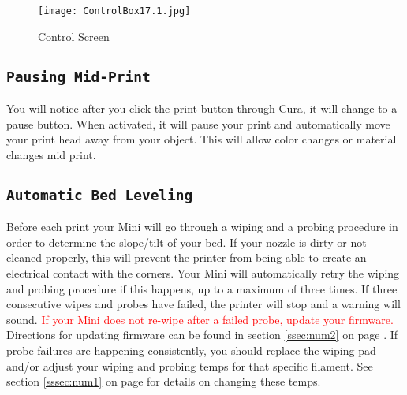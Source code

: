 

\begin{figure}[H]
\centering
\texttt{[image: ControlBox17.1.jpg]}
\caption{Control Screen}
\label{fig:Control}
\end{figure}
\subsection{\texttt{Pausing Mid-Print}}
You will notice after you click the print button through Cura, it will change to a pause button. When activated, it will pause your print and automatically move your print head away from your object. This will allow color changes or material changes mid print.

\subsection{\texttt{Automatic Bed Leveling}}
Before each print your Mini will go through a wiping and a probing procedure in order to determine the slope/tilt of your bed. If your nozzle is dirty or not cleaned properly, this will prevent the printer from being able to create an electrical contact with the corners. Your Mini will automatically retry the wiping and probing procedure if this happens, up to a maximum of three times. If three consecutive wipes and probes have failed, the printer will stop and a warning will sound. \textcolor{red}{If your Mini does not re-wipe after a failed probe, update your firmware.} Directions for updating firmware can be found in section \ref{ssec:num2} on page \pageref{ssec:num2}. If probe failures are happening consistently, you should replace the wiping pad and/or adjust your wiping and probing temps for that specific filament. See section \ref{sssec:num1} on page \pageref{sssec:num1} for details on changing these temps. %

